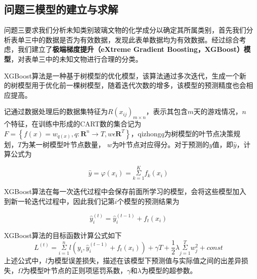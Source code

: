 \documentclass{MathModeling}
\begin{document}
  \newpage
  \subsection{问题三模型的建立与求解}
  	问题三要求我们分析未知类别玻璃文物的化学成分以确定其所属类别，首先我们分析表单三中的数据是否为有效数据，发现此表单数据均为有效数据。经过综合考虑，我们建立了{\textbf{极端梯度提升（eXtreme Gradient Boosting，XGBoost）模型}}，对表单三中的未知文物进行合理的分类。

	XGBoost算法是一种基于树模型的优化模型，该算法通过多次迭代，生成一个新的树模型用于优化前一棵树模型，随着迭代次数的增多，该模型的预测精度也会相应提高\textcolor{blue}{\cite{pxgboost1}}。

	记通过数据处理后的数据集特征为$R\left( x_{ij} \right) _{m\times n}$，表示其包含$m$天的游戏情况，$n$个特征，在训练中形成的CART数的集合记为$F=\left\{ f\left( x \right) =w_{q\left( x \right)},q:\mathbf{R}^n\rightarrow T,w\epsilon \mathbf{R}^T \right\}$，qizhong$q$为树模型的叶节点决策规划，$T$为某一树模型叶节点数量，
	$w$为叶节点对应得分\cite{pxgboost2}。对于预测的$y$值，即$\hat{y}$，计算公式为
	 
	\begin{equation}
		\hat{y}=\varphi \left( x_i \right) =\underset{k=1}{\overset{K}{\Sigma}}f_k\left( x_i \right)
	\end{equation}
	
	XGBoost算法在每一次迭代过程中会保存前面所学习的模型，会将这些模型加入到新一轮迭代过程中，因此我们记第$i$个模型的预测结果为
	
	\begin{equation}
		\hat{y}_{i}^{\left( t \right)}=\hat{y}_{i}^{\left( t-1 \right)}+f_t\left( x_i \right)
	\end{equation}

	XGBoost算法的目标函数计算公式如下
	\begin{equation}
		L^{\left( t \right)}=\underset{i=1}{\overset{n}{\Sigma}}l\left( y_i,\hat{y}_{i}^{\left( t-1 \right)}+f_t\left( x_i \right) \right) +\gamma T+\frac{1}{2}\lambda \underset{j=1}{\overset{T}{\Sigma}}w_{j}^{2}+const
	\end{equation}
	上述公式中，$l$为模型误差损失，描述在该模型下预测值与实际值之间的出差异损失，$\varOmega$为模型叶节点的正则项惩罚系数，$\gamma$和$\lambda$为模型的超参数\textcolor{blue}{\cite{pxgboost2}}。
\end{document}
